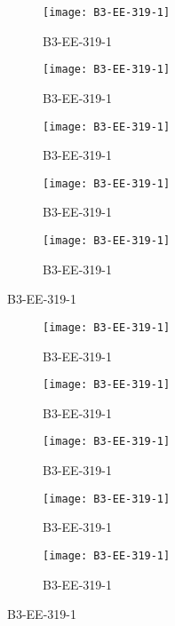 \documentclass{article}
\begin{document}
	\clearpage
\begin{figure}[]
	\centering
	\begin{subfigure}{0.19\textwidth}
		\centering
		\texttt{[image: B3-EE-319-1]}
		\caption*{\Large{B3-EE-319-1}}
	\end{subfigure}\hfil
	\begin{subfigure}{0.19\textwidth}
		\centering
		\texttt{[image: B3-EE-319-1]}
		\caption*{\Large{B3-EE-319-1}}
	\end{subfigure}\hfil
	\begin{subfigure}{0.19\textwidth}
		\centering
		\texttt{[image: B3-EE-319-1]}
		\caption*{\Large{B3-EE-319-1}}
	\end{subfigure}\hfil
	\begin{subfigure}{0.19\textwidth}
		\centering
		\texttt{[image: B3-EE-319-1]}
		\caption*{\Large{B3-EE-319-1}}
	\end{subfigure} \hfil
	\begin{subfigure}{0.19\textwidth}
		\centering
		\texttt{[image: B3-EE-319-1]}
		\caption*{\Large{B3-EE-319-1}}
	\end{subfigure}
\end{figure}

\begin{figure}[]
	\centering
	\begin{subfigure}{0.19\textwidth}
		\centering
		\texttt{[image: B3-EE-319-1]}
		\caption*{\Large{B3-EE-319-1}}
	\end{subfigure}\hfil
	\begin{subfigure}{0.19\textwidth}
		\centering
		\texttt{[image: B3-EE-319-1]}
		\caption*{\Large{B3-EE-319-1}}
	\end{subfigure}\hfil
	\begin{subfigure}{0.19\textwidth}
		\centering
		\texttt{[image: B3-EE-319-1]}
		\caption*{\Large{B3-EE-319-1}}
	\end{subfigure}\hfil
	\begin{subfigure}{0.19\textwidth}
		\centering
		\texttt{[image: B3-EE-319-1]}
		\caption*{\Large{B3-EE-319-1}}
	\end{subfigure} \hfil
	\begin{subfigure}{0.19\textwidth}
		\centering
		\texttt{[image: B3-EE-319-1]}
		\caption*{\Large{B3-EE-319-1}}
	\end{subfigure}
\end{figure}
\end{document}
